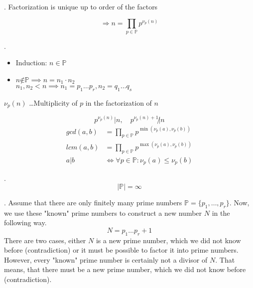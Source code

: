 \Remark.
Factorization is unique up to order of the factors

\[
  \Rightarrow n = \prod_{p \in \mathbb{P}} p^{\nu_p(n)}
\]

\Proof.
\begin{itemize}

  \item Induction: $n ∈ \mathbb{P}$

  \item $n \not ∈ \mathbb{P} \implies n = n_1 \cdot n_2$\\
  $n_1, n_2 < n \implies n_1 = p_1 \dots p_r, n_2 = q_1  \dots q_s$

\end{itemize}

$\nu_p(n)$ \ldots Multiplicity of $p$ in the factorization of $n$

\[
  p^{\nu_p(n)} | n, \quad p^{\nu_p(n)+1} \not| n
\]
\begin{align*}
  gcd(a,b) &= \prod_{p \in \mathbb{P}} p ^{\min(\nu_p(a), \nu_p(b))} \\
  lcm(a,b) &= \prod_{p \in \mathbb{P}} p ^{\max(\nu_p(a), \nu_p(b))} \\
  a|b &\iff \forall p \in \mathbb{P} : \nu_p(a) \leq \nu_p(b)
\end{align*}

\Theorem.
\[
  | \mathbb{P} | = \infty
\]

\Proof.
Assume that there are only finitely many prime numbers $\mathbb{P} = \{p_1, \ldots , p_r\}$. Now, we use these "known" prime numbers to construct a new number $N$ in the following way. 
\[
	N = p_1 \ldots p_r + 1 
\]
There are two cases, either $N$ is a new prime number, which we did not know before (contradiction) or it must be possible to factor it into prime numbers. However, every "known" prime number is certainly not a divisor of $N$. That means, that there must be a new prime number, which we did not know before (contradiction).
